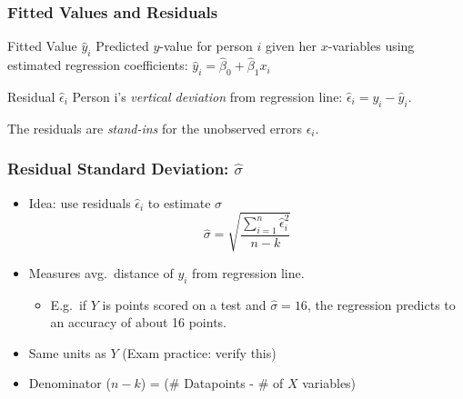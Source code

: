 \begin{frame}
\frametitle{Fitted Values and Residuals}

\begin{block}{Fitted Value $\widehat{y}_i$}
Predicted $y$-value for person $i$ given her $x$-variables using estimated regression coefficients: \alert{$\widehat{y}_i = \widehat{\beta}_0 + \widehat{\beta}_1 x_{i}$}
\end{block}


\begin{block}{Residual $\widehat{\epsilon}_i$}
  Person i's \emph{vertical deviation} from regression line: \alert{$\widehat{\epsilon}_i = y_i - \widehat{y}_i$}. 
\end{block}

\vspace{1em}
\alert{The residuals are \emph{stand-ins} for the unobserved errors $\epsilon_i$.}

\end{frame}
\begin{frame}
\frametitle{Residual Standard Deviation: $\widehat{\sigma}$}
	\begin{itemize}
    \item Idea: use residuals $\widehat{\epsilon}_i$ to estimate $\sigma$
	$$\widehat{\sigma}  = \sqrt{\frac{\sum_{i=1}^n \widehat{\epsilon}_i^2}{n -k}}$$ 
		\item Measures avg.\ distance of $y_i$ from regression line.
				\begin{itemize}
					\item E.g.\ if $Y$ is points scored on a test and $\widehat{\sigma}=16$, the regression predicts to an accuracy of about 16 points. 
				\end{itemize}
	\item Same units as $Y$ (Exam practice: verify this) 
	\item Denominator  ($n-k$) = (\# Datapoints - \# of $X$ variables) 
	\end{itemize}

\end{frame}




